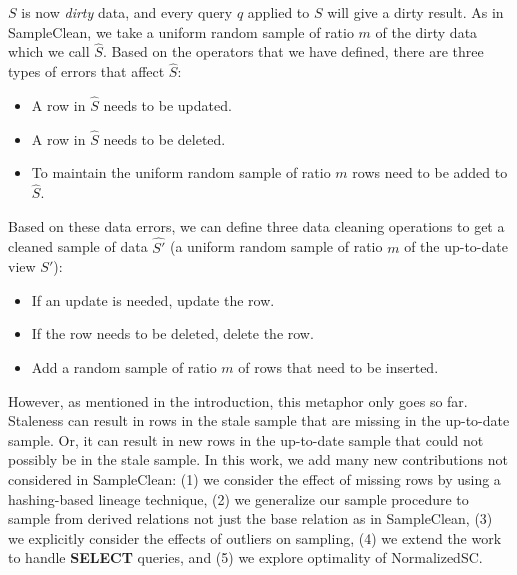 $S$ is now \emph{dirty} data, and every query $q$ applied to $S$ will give a dirty result.
As in SampleClean, we take a uniform random sample of ratio $m$ of the dirty data which we call $\hat{S}$.
Based on the operators that we have defined, there are three types of errors that affect $\hat{S}$:
\begin{itemize}
\item A row in $\hat{S}$ needs to be updated.
\item A row in $\hat{S}$ needs to be deleted.
\item To maintain the uniform random sample of ratio $m$ rows need to be added to $\hat{S}$. 
\end{itemize}

Based on these data errors, we can define three data cleaning operations to get a cleaned sample of data $\hat{S'}$ (a uniform random sample of ratio $m$ of the up-to-date view $S'$):
\begin{itemize}
\item If an update is needed, update the row.
\item If the row needs to be deleted, delete the row.
\item Add a random sample of ratio $m$ of rows that need to be inserted.
\end{itemize}

However, as mentioned in the introduction, this metaphor only goes so far.
Staleness can result in rows in the stale sample that are missing in the up-to-date sample.
Or, it can result in new rows in the up-to-date sample that could not possibly be in the stale sample.
In this work, we add many new contributions not considered in SampleClean: (1) we consider the effect of missing rows by using a hashing-based lineage technique, (2) we generalize our sample procedure to sample from derived relations not just the base relation as in SampleClean, (3) we explicitly consider the effects of outliers on sampling, (4) we extend the work to handle \textbf{SELECT} queries, and (5) we explore optimality of NormalizedSC.

